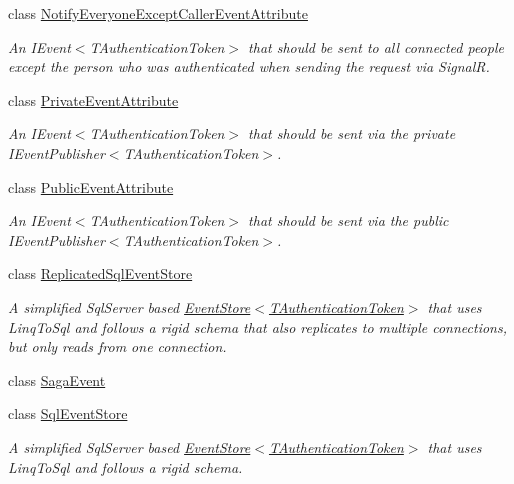 \begin{DoxyCompactItemize}
class \hyperlink{classCqrs_1_1Events_1_1NotifyEveryoneExceptCallerEventAttribute}{Notify\+Everyone\+Except\+Caller\+Event\+Attribute}
\begin{DoxyCompactList}\small\item\em An I\+Event$<$\+T\+Authentication\+Token$>$ that should be sent to all connected people except the person who was authenticated when sending the request via SignalR. \end{DoxyCompactList}\item 
class \hyperlink{classCqrs_1_1Events_1_1PrivateEventAttribute}{Private\+Event\+Attribute}
\begin{DoxyCompactList}\small\item\em An I\+Event$<$\+T\+Authentication\+Token$>$ that should be sent via the private I\+Event\+Publisher$<$\+T\+Authentication\+Token$>$. \end{DoxyCompactList}\item 
class \hyperlink{classCqrs_1_1Events_1_1PublicEventAttribute}{Public\+Event\+Attribute}
\begin{DoxyCompactList}\small\item\em An I\+Event$<$\+T\+Authentication\+Token$>$ that should be sent via the public I\+Event\+Publisher$<$\+T\+Authentication\+Token$>$. \end{DoxyCompactList}\item 
class \hyperlink{classCqrs_1_1Events_1_1ReplicatedSqlEventStore}{Replicated\+Sql\+Event\+Store}
\begin{DoxyCompactList}\small\item\em A simplified Sql\+Server based \hyperlink{classCqrs_1_1Events_1_1EventStore_a6346cb2aea4c5b4e740dc6cfb15abab8_a6346cb2aea4c5b4e740dc6cfb15abab8}{Event\+Store$<$\+T\+Authentication\+Token$>$} that uses Linq\+To\+Sql and follows a rigid schema that also replicates to multiple connections, but only reads from one connection. \end{DoxyCompactList}\item 
class \hyperlink{classCqrs_1_1Events_1_1SagaEvent}{Saga\+Event}
\item 
class \hyperlink{classCqrs_1_1Events_1_1SqlEventStore}{Sql\+Event\+Store}
\begin{DoxyCompactList}\small\item\em A simplified Sql\+Server based \hyperlink{classCqrs_1_1Events_1_1EventStore_a6346cb2aea4c5b4e740dc6cfb15abab8_a6346cb2aea4c5b4e740dc6cfb15abab8}{Event\+Store$<$\+T\+Authentication\+Token$>$} that uses Linq\+To\+Sql and follows a rigid schema. \end{DoxyCompactList}\end{DoxyCompactItemize}
